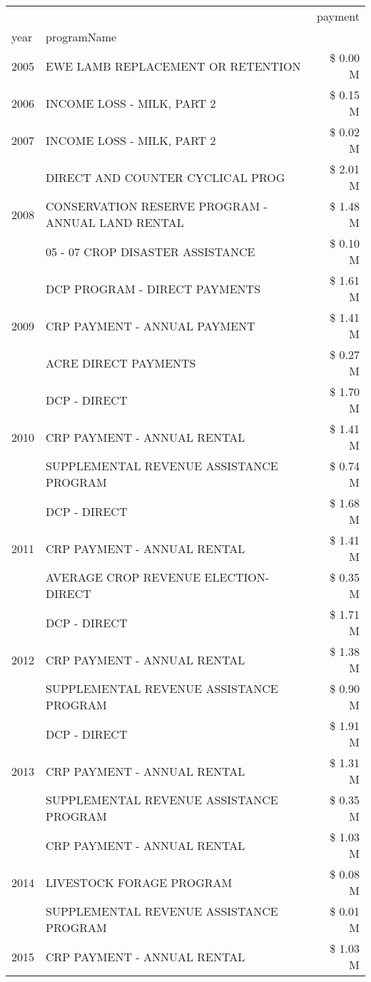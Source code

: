 \begin{tabular}{llr}
\toprule
 &  & payment \\
year & programName &  \\
\midrule
2005 & EWE LAMB REPLACEMENT OR RETENTION & \$ 0.00 M \\
\cline{1-3}
2006 & INCOME LOSS - MILK, PART 2 & \$ 0.15 M \\
\cline{1-3}
2007 & INCOME LOSS - MILK, PART 2 & \$ 0.02 M \\
\cline{1-3}
\multirow[t]{3}{*}{2008} & DIRECT AND COUNTER CYCLICAL PROG & \$ 2.01 M \\
 & CONSERVATION RESERVE PROGRAM - ANNUAL LAND RENTAL & \$ 1.48 M \\
 & 05 - 07 CROP DISASTER ASSISTANCE & \$ 0.10 M \\
\cline{1-3}
\multirow[t]{3}{*}{2009} & DCP PROGRAM - DIRECT PAYMENTS & \$ 1.61 M \\
 & CRP PAYMENT - ANNUAL PAYMENT & \$ 1.41 M \\
 & ACRE DIRECT PAYMENTS & \$ 0.27 M \\
\cline{1-3}
\multirow[t]{3}{*}{2010} & DCP - DIRECT & \$ 1.70 M \\
 & CRP PAYMENT - ANNUAL RENTAL & \$ 1.41 M \\
 & SUPPLEMENTAL REVENUE ASSISTANCE PROGRAM & \$ 0.74 M \\
\cline{1-3}
\multirow[t]{3}{*}{2011} & DCP - DIRECT & \$ 1.68 M \\
 & CRP PAYMENT - ANNUAL RENTAL & \$ 1.41 M \\
 & AVERAGE CROP REVENUE ELECTION-DIRECT & \$ 0.35 M \\
\cline{1-3}
\multirow[t]{3}{*}{2012} & DCP - DIRECT & \$ 1.71 M \\
 & CRP PAYMENT - ANNUAL RENTAL & \$ 1.38 M \\
 & SUPPLEMENTAL REVENUE ASSISTANCE PROGRAM & \$ 0.90 M \\
\cline{1-3}
\multirow[t]{3}{*}{2013} & DCP - DIRECT & \$ 1.91 M \\
 & CRP PAYMENT - ANNUAL RENTAL & \$ 1.31 M \\
 & SUPPLEMENTAL REVENUE ASSISTANCE PROGRAM & \$ 0.35 M \\
\cline{1-3}
\multirow[t]{3}{*}{2014} & CRP PAYMENT - ANNUAL RENTAL & \$ 1.03 M \\
 & LIVESTOCK FORAGE PROGRAM & \$ 0.08 M \\
 & SUPPLEMENTAL REVENUE ASSISTANCE PROGRAM & \$ 0.01 M \\
\cline{1-3}
\multirow[t]{2}{*}{2015} & CRP PAYMENT - ANNUAL RENTAL & \$ 1.03 M \\

\end{tabular}
